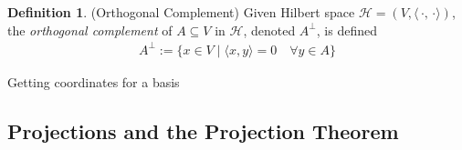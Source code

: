 \documentclass[12pt]{article}
\numberwithin{equation}{section} %
\theoremstyle{plain}
\newtheorem{thm}{Theorem}[section]
\newtheorem{cor}[thm]{Corollary}
\theoremstyle{definition}
\newtheorem{defn}[thm]{Definition}
\theoremstyle{remark}
\newtheorem*{rmk}{Remark}
\newcommand{\calH}{\mathcal{H}}
\begin{document}
\begin{defn}(Orthogonal Complement)
Given Hilbert space $\calH=(V,\langle\,\cdot,\,\cdot\rangle)$, the
\emph{orthogonal complement} of $A\subseteq V$ in $\calH$, denoted
$A^\perp$, is defined
\begin{align*}
  A^\perp :=
  \{
    x \in V \;|\; \langle x,y\rangle = 0
    \quad \forall y\in A
  \}
\end{align*}
\end{defn}




Getting coordinates for a basis


\clearpage
\subsection{Projections and the Projection Theorem}
\end{document}
